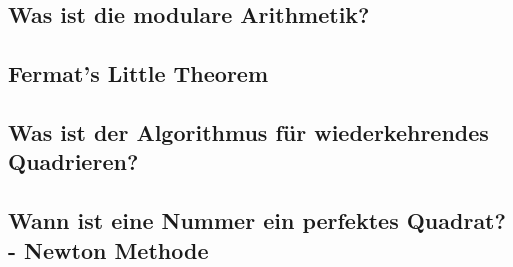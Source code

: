\documentclass[german,12pt,a4paper]{article}
\begin{document}
\subsection{Was ist die modulare Arithmetik?}
\subsection{Fermat's Little Theorem}
\subsection{Was ist der Algorithmus für wiederkehrendes Quadrieren?}
\subsection{Wann ist eine Nummer ein perfektes Quadrat? - Newton Methode}
\newpage

\section*{}
\printbibliography

\newpage

\listoftables
{}
\newpage

\listoffigures
{}
\end{document}

